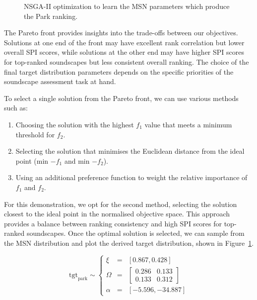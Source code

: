 \documentclass[
  authoryear,
  preprint,
  3p]{elsarticle}
\providecommand{\tightlist}{%
  \setlength{\itemsep}{0pt}\setlength{\parskip}{0pt}}\usepackage{longtable,booktabs,array}
\begin{document}
\begin{figure}
\begin{minipage}{0.50\linewidth}
{}


\end{minipage}%

\caption{\label{fig-pymoo-parks}NSGA-II optimization to learn the MSN
parameters which produce the Park ranking.}

\end{figure}%

The Pareto front provides insights into the trade-offs between our
objectives. Solutions at one end of the front may have excellent rank
correlation but lower overall SPI scores, while solutions at the other
end may have higher SPI scores for top-ranked soundscapes but less
consistent overall ranking. The choice of the final target distribution
parameters depends on the specific priorities of the soundscape
assessment task at hand.

To select a single solution from the Pareto front, we can use various
methods such as:

\begin{enumerate}
\def\labelenumi{\arabic{enumi}.}
\tightlist
\item
  Choosing the solution with the highest \(f_1\) value that meets a
  minimum threshold for \(f_2\).
\item
  Selecting the solution that minimises the Euclidean distance from the
  ideal point (min \(-f_1\) and min \(-f_2\)).
\item
  Using an additional preference function to weight the relative
  importance of \(f_1\) and \(f_2\).
\end{enumerate}

For this demonstration, we opt for the second method, selecting the
solution closest to the ideal point in the normalised objective space.
This approach provides a balance between ranking consistency and high
SPI scores for top-ranked soundscapes. Once the optimal solution is
selected, we can sample from the MSN distribution and plot the derived
target distribution, shown in Figure~\ref{fig-pymoo-parks}.

\[
  \text{tgt}_{\text{park}} \sim  \left\{\begin{matrix}
    \xi&=&[0.867, 0.428] \\
    \Omega&=&\begin{bmatrix}
        0.286 & 0.133 \\
        0.133 & 0.312
    \end{bmatrix} \\
    \alpha&=&[-5.596, -34.887]
\end{matrix}\right.
\]
\end{document}
